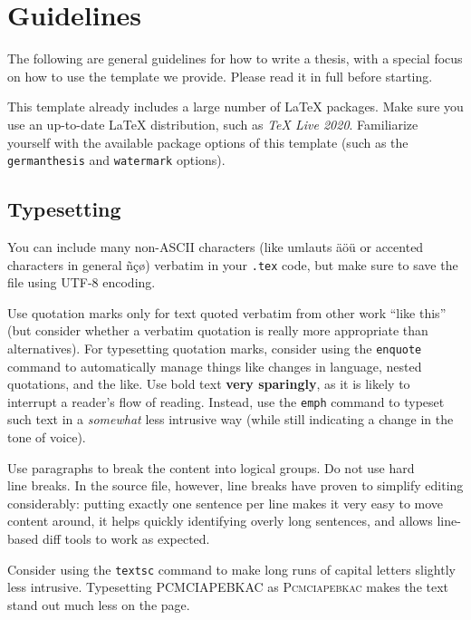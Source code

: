 \documentclass[]{nsm-thesis}
\begin{document}
\cleardoublepage
{}

\chapter{Guidelines}

The following are general guidelines for how to write a thesis, with a special focus on how to use the template we provide.
Please read it in full before starting.

This template already includes a large number of LaTeX packages.
Make sure you use an up-to-date LaTeX distribution, such as \emph{TeX Live 2020}.
Familiarize yourself with the available package options of this template (such as the \texttt{germanthesis} and \texttt{watermark} options).


\section{Typesetting}

You can include many non-ASCII characters (like umlauts äöü or accented characters in general ñçø) verbatim in your \texttt{.tex} code, but make sure to save the file using UTF-8 encoding.

Use quotation marks only for text quoted verbatim from other work \enquote{like this} (but consider whether a verbatim quotation is really more appropriate than alternatives).
For typesetting quotation marks, consider using the \texttt{enquote} command to automatically manage things like changes in language, nested quotations, and the like.
Use bold text \textbf{very sparingly}, as it is likely to interrupt a reader's flow of reading.
Instead, use the \texttt{emph} command to typeset such text in a \emph{somewhat} less intrusive way (while still indicating a change in the tone of voice).

Use paragraphs to break the content into logical groups.
Do not use hard\\ line breaks. In the source file, however, line breaks have proven to simplify editing considerably: putting exactly one sentence per line makes it very easy to move content around, it helps quickly identifying overly long sentences, and allows line-based diff tools to work as expected.

Consider using the \texttt{textsc} command to make long runs of capital letters slightly less intrusive.
Typesetting PCMCIAPEBKAC as \textsc{Pcmciapebkac} makes the text stand out much less on the page.
\end{document}
